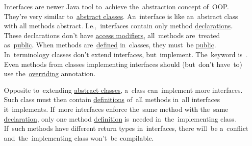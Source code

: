 \label{javainterfaces}
Interfaces are newer Java tool to~achieve the~\hyperref[abstraction]{abstraction concept} of~\hyperref[objectorientedprogramming]{OOP}.
They're very similar to~\hyperref[javaabstractclasses]{abstract classes}.
An~interface is like an~abstract class with all methods abstract.
I.e.,~interfaces contain only method \hyperref[declarationdefinition]{declarations}.
These declarations don't have \hyperref[javaaccessmodifiers]{access modifiers}, all~methods are~treated as~\hyperref[javapublic]{public}.
When methods are~\hyperref[declarationdefinition]{defined} in~classes, they must~be \hyperref[javapublic]{public}.
In~terminology classes don't extend interfaces, but~implement.
The~keyword is~.
Even methods from classes implementing interfaces should (but~don't have~to) use the~\hyperref[javaoverride]{overriding} annotation.

Opposite to~extending \hyperref[javaabstractclasses]{abstract classes}, a~class can~implement more interfaces.
Such class must then contain \hyperref[declarationdefinition]{definitions} of~all methods in~all interfaces it~implements.
If~more interfaces enforce the~same method with the~same \hyperref[declarationdefinition]{declaration}, only one method \hyperref[declarationdefinition]{definition} is~needed in~the~implementing class.
If~such methods have different return types in~interfaces, there will~be a~conflict and~the~implementing class won't~be compilable.
\newpage

